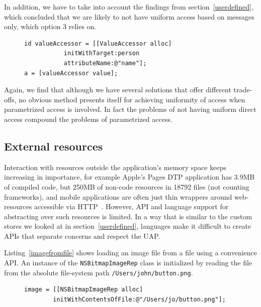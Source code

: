 \documentclass[preprint]{sigplanconf}
\begin{document}
In addition, we have to take into account the findings from
section~\ref{userdefined}, which concluded that we are likely to not have uniform access based on
messages only, which option 3 relies on.  

\begin{figure}[htbp]
\begin{lstlisting}[style=numbers,label=valueaccessoruse,caption=Keyed access vs. using a ValueAccessor]
id valueAccessor = [[ValueAccessor alloc]
           initWithTarget:person 
           attributeName:@"name"];
a = [valueAccessor value];
\end{lstlisting}
\end{figure}

Again, we find that although we have several solutions that offer different trade-offs, no obvious
method presents itself for achieving uniformity of access when parametrized access is involved.
In fact the problems of not having uniform direct access compound the problems of parametrized access.


\subsection{External resources}

Interaction with resources outside the application's memory space keeps increasing
in importance,
for example Apple's Pages DTP application has 3.9MB of compiled code,
but 250MB of non-code resources in 18792 files (not counting frameworks), and
mobile applications are often just thin wrappers around web-resources accessible
via HTTP~\cite{http}.  However, API and language support
for abstracting over such resources is limited.  In a way that is similar to the custom stores we looked at in section~\ref{userdefined}, languages make it difficult to create APIs that separate concerns
and respect the UAP.

Listing~\ref{imagefromfile} shows loading an image file from a file using a convenience
API.   An instance of the {\tt NSBitmapImageRep} class is initialized by reading the file
from the absolute file-system path {\tt /Users/john/button.png}.

\begin{figure}[htbp]
\begin{lstlisting}[style=numbers,label=imagefromfile,caption=Accessing an image from the file system]
image = [[NSBitmapImageRep alloc] 
        initWithContentsOfFile:@"/Users/jo/button.png"];
\end{lstlisting}
\end{figure}
\end{document}
